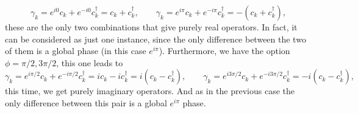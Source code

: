 \begin{equation*}
    \gamma_k = e^{i0}c_k + e^{-i0}c_k^\dagger = c_k + c_k^\dagger, \qquad \gamma_k = e^{i\pi}c_k + e^{-i\pi}c_k^\dagger = -(c_k + c_k^\dagger),
\end{equation*}
these are the only two combinations that give purely real operators. In fact, it can be considered as just one instance, since the only difference between the two of them is a global phase (in this case $e^{i\pi}$). Furthermore, we have the option $\phi = \pi/2, 3\pi/2$, this one leads to
\begin{equation*}
    \gamma_k = e^{i\pi/2}c_k + e^{-i\pi/2}c_k^\dagger = ic_k -i c_k^\dagger = i(c_k - c_k^\dagger), \qquad \gamma_k = e^{i3\pi/2}c_k + e^{-i3\pi/2}c_k^\dagger = -i(c_k -c_k^\dagger),
\end{equation*}
this time, we get purely imaginary operators. And as in the previous case the only difference between this pair is a global $e^{i\pi}$ phase.\\


